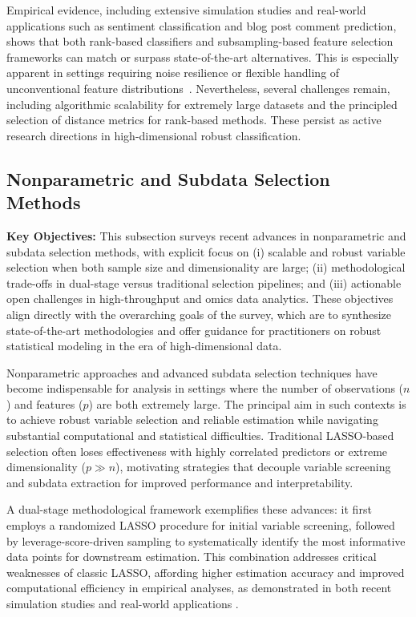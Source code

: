 \documentclass[sigconf]{acmart}
\begin{document}
Empirical evidence, including extensive simulation studies and real-world applications such as sentiment classification and blog post comment prediction, shows that both rank-based classifiers and subsampling-based feature selection frameworks can match or surpass state-of-the-art alternatives. This is especially apparent in settings requiring noise resilience or flexible handling of unconventional feature distributions~\cite{ref102,ref103}. Nevertheless, several challenges remain, including algorithmic scalability for extremely large datasets and the principled selection of distance metrics for rank-based methods. These persist as active research directions in high-dimensional robust classification.

\subsection{Nonparametric and Subdata Selection Methods}

\textbf{Key Objectives:} This subsection surveys recent advances in nonparametric and subdata selection methods, with explicit focus on (i) scalable and robust variable selection when both sample size and dimensionality are large; (ii) methodological trade-offs in dual-stage versus traditional selection pipelines; and (iii) actionable open challenges in high-throughput and omics data analytics. These objectives align directly with the overarching goals of the survey, which are to synthesize state-of-the-art methodologies and offer guidance for practitioners on robust statistical modeling in the era of high-dimensional data.

Nonparametric approaches and advanced subdata selection techniques have become indispensable for analysis in settings where the number of observations ($n$) and features ($p$) are both extremely large. The principal aim in such contexts is to achieve robust variable selection and reliable estimation while navigating substantial computational and statistical difficulties. Traditional LASSO-based selection often loses effectiveness with highly correlated predictors or extreme dimensionality ($p \gg n$), motivating strategies that decouple variable screening and subdata extraction for improved performance and interpretability.

A dual-stage methodological framework exemplifies these advances: it first employs a randomized LASSO procedure for initial variable screening, followed by leverage-score-driven sampling to systematically identify the most informative data points for downstream estimation. This combination addresses critical weaknesses of classic LASSO, affording higher estimation accuracy and improved computational efficiency in empirical analyses, as demonstrated in both recent simulation studies and real-world applications \cite{ref102,ref100}.
\end{document}
